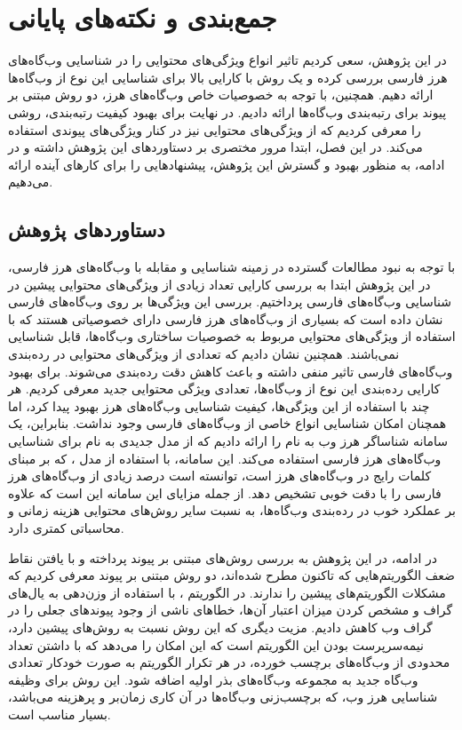 \documentclass[twoside, a4paper,11pt]{book}
\numberwithin{equation}{chapter}
\numberwithin{table}{chapter}
\numberwithin{figure}{chapter}
\numberwithin{equation}{chapter}
\begin{document}
\chapter{جمع‌بندی و نکته‌های پایانی}
\label{chapter:conclusion}
\thispagestyle{plain}
در این پژوهش، سعی کردیم تاثیر انواع ویژگی‌های محتوایی را در شناسایی وب‌گاه‌های هرز فارسی بررسی کرده و یک روش با کارایی بالا برای شناسایی این نوع از وب‌گاه‌ها ارائه دهیم. همچنین، با توجه به خصوصیات خاص وب‌گاه‌های هرز، دو روش مبتنی بر پیوند برای رتبه‌بندی وب‌گاه‌ها ارائه دادیم. در نهایت برای بهبود کیفیت رتبه‌بندی، روشی را معرفی کردیم که از ویژگی‌های محتوایی نیز در کنار ویژگی‌های پیوندی استفاده می‌کند. در این فصل، ابتدا مرور مختصری بر دستاوردهای این پژوهش داشته و در ادامه، به منظور بهبود و گسترش این پژوهش، پیشنهادهایی را برای کارهای آینده ارائه می‌دهیم. 

\section{دستاورد‌های پژوهش}
با توجه به نبود مطالعات گسترده در زمینه شناسایی و مقابله با وب‌گاه‌‌های هرز فارسی، در این پژوهش ابتدا به بررسی کارایی تعداد زیادی از ویژگی‌های محتوایی پیشین در شناسایی وب‌گاه‌های فارسی پرداختیم. بررسی این ویژگی‌‌ها بر روی وب‌گاه‌های فارسی نشان داده است که بسیاری از وب‌گاه‌های هرز فارسی دارای خصوصیاتی هستند که با استفاده از ویژگی‌های محتوایی مربوط به خصوصیات ساختاری وب‌گاه‌ها، قابل شناسایی نمی‌باشند. همچنین نشان دادیم که تعدادی از ویژگی‌های محتوایی در رده‌بندی وب‌گاه‌های فارسی تاثیر منفی داشته و باعث کاهش دقت رده‌بندی می‌شوند. برای بهبود کارایی رده‌بندی این نوع از وب‌گاه‌ها، تعدادی ویژگی محتوایی جدید معرفی کردیم. هر چند با استفاده از این ویژگی‌ها، کیفیت شناسایی وب‌گاه‌های هرز بهبود پیدا کرد، اما همچنان امکان شناسایی انواع خاصی از وب‌گاه‌های فارسی وجود نداشت. بنابراین، یک سامانه شناساگر هرز وب به نام  را ارائه دادیم که از مدل جدیدی به نام  برای شناسایی وب‌گاه‌های هرز فارسی استفاده می‌کند. این سامانه، با استفاده از مدل ، که بر مبنای کلمات رایج در وب‌گاه‌های هرز است، توانسته است درصد زیادی از وب‌گاه‌‌های هرز فارسی را با دقت خوبی تشخیص دهد. از جمله مزایای این سامانه این است که علاوه بر عملکرد خوب در رده‌بندی وب‌گاه‌ها، به نسبت سایر روش‌های محتوایی هزینه زمانی و محاسباتی کمتری دارد. 

در ادامه، در این پژوهش به بررسی روش‌های مبتنی بر پیوند پرداخته و با یافتن نقاط ضعف الگوریتم‌هایی که تاکنون مطرح شده‌‌اند، دو روش مبتنی بر پیوند معرفی کردیم که مشکلات الگوریتم‌های پیشین را ندارند. 
در الگوریتم ، با استفاده از وزن‌دهی به یال‌های گراف و مشخص کردن میزان اعتبار آن‌ها، خطاهای ناشی از وجود پیوندهای جعلی را در گراف وب کاهش دادیم. مزیت دیگری که این روش نسبت به روش‌های پیشین دارد، نیمه‌سرپرست بودن این الگوریتم است که این امکان را می‌دهد که با داشتن تعداد محدودی از وب‌گاه‌های برچسب خورده، در هر تکرار الگوریتم به صورت خودکار تعدادی وب‌گاه جدید به مجموعه وب‌گاه‌های بذر اولیه اضافه شود. این روش برای وظیفه شناسایی هرز وب، که برچسب‌زنی وب‌گاه‌ها در آن کاری زمان‌بر و پرهزینه می‌باشد، بسیار مناسب است. 
\end{document}
